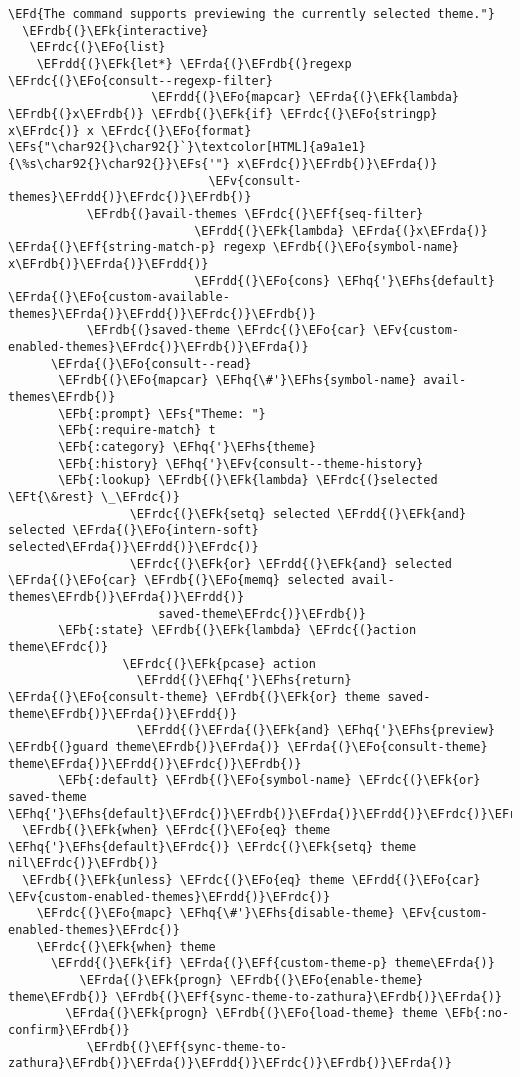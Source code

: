 \documentclass[a4wide,10pt]{article}
\newcommand{\EFs}[1]{\textcolor{EFs}{#1}} %
\newcommand{\EFd}[1]{\textcolor{EFd}{#1}} %
\newcommand{\EFk}[1]{\textcolor{EFk}{#1}} %
\newcommand{\EFb}[1]{\textcolor{EFb}{#1}} %
\newcommand{\EFf}[1]{\textcolor{EFf}{#1}} %
\newcommand{\EFv}[1]{\textcolor{EFv}{#1}} %
\newcommand{\EFt}[1]{\textcolor{EFt}{#1}} %
\newcommand{\EFo}[1]{\textcolor{EFo}{#1}} %
\newcommand{\EFhq}[1]{\textcolor{EFhq}{#1}} %
\newcommand{\EFhs}[1]{\textcolor{EFhs}{#1}} %
\newcommand{\EFrda}[1]{\textcolor{EFrda}{#1}} %
\newcommand{\EFrdb}[1]{\textcolor{EFrdb}{#1}} %
\newcommand{\EFrdc}[1]{\textcolor{EFrdc}{#1}} %
\newcommand{\EFrdd}[1]{\textcolor{EFrdd}{#1}} %
\begin{document}
\begin{Code}
\begin{Verbatim}
\EFd{The command supports previewing the currently selected theme."}
  \EFrdb{(}\EFk{interactive}
   \EFrdc{(}\EFo{list}
    \EFrdd{(}\EFk{let*} \EFrda{(}\EFrdb{(}regexp \EFrdc{(}\EFo{consult--regexp-filter}
                    \EFrdd{(}\EFo{mapcar} \EFrda{(}\EFk{lambda} \EFrdb{(}x\EFrdb{)} \EFrdb{(}\EFk{if} \EFrdc{(}\EFo{stringp} x\EFrdc{)} x \EFrdc{(}\EFo{format} \EFs{"\char92{}\char92{}`}\textcolor[HTML]{a9a1e1}{\%s\char92{}\char92{}}\EFs{'"} x\EFrdc{)}\EFrdb{)}\EFrda{)}
                            \EFv{consult-themes}\EFrdd{)}\EFrdc{)}\EFrdb{)}
           \EFrdb{(}avail-themes \EFrdc{(}\EFf{seq-filter}
                          \EFrdd{(}\EFk{lambda} \EFrda{(}x\EFrda{)} \EFrda{(}\EFf{string-match-p} regexp \EFrdb{(}\EFo{symbol-name} x\EFrdb{)}\EFrda{)}\EFrdd{)}
                          \EFrdd{(}\EFo{cons} \EFhq{'}\EFhs{default} \EFrda{(}\EFo{custom-available-themes}\EFrda{)}\EFrdd{)}\EFrdc{)}\EFrdb{)}
           \EFrdb{(}saved-theme \EFrdc{(}\EFo{car} \EFv{custom-enabled-themes}\EFrdc{)}\EFrdb{)}\EFrda{)}
      \EFrda{(}\EFo{consult--read}
       \EFrdb{(}\EFo{mapcar} \EFhq{\#'}\EFhs{symbol-name} avail-themes\EFrdb{)}
       \EFb{:prompt} \EFs{"Theme: "}
       \EFb{:require-match} t
       \EFb{:category} \EFhq{'}\EFhs{theme}
       \EFb{:history} \EFhq{'}\EFv{consult--theme-history}
       \EFb{:lookup} \EFrdb{(}\EFk{lambda} \EFrdc{(}selected \EFt{\&rest} \_\EFrdc{)}
                 \EFrdc{(}\EFk{setq} selected \EFrdd{(}\EFk{and} selected \EFrda{(}\EFo{intern-soft} selected\EFrda{)}\EFrdd{)}\EFrdc{)}
                 \EFrdc{(}\EFk{or} \EFrdd{(}\EFk{and} selected \EFrda{(}\EFo{car} \EFrdb{(}\EFo{memq} selected avail-themes\EFrdb{)}\EFrda{)}\EFrdd{)}
                     saved-theme\EFrdc{)}\EFrdb{)}
       \EFb{:state} \EFrdb{(}\EFk{lambda} \EFrdc{(}action theme\EFrdc{)}
                \EFrdc{(}\EFk{pcase} action
                  \EFrdd{(}\EFhq{'}\EFhs{return} \EFrda{(}\EFo{consult-theme} \EFrdb{(}\EFk{or} theme saved-theme\EFrdb{)}\EFrda{)}\EFrdd{)}
                  \EFrdd{(}\EFrda{(}\EFk{and} \EFhq{'}\EFhs{preview} \EFrdb{(}guard theme\EFrdb{)}\EFrda{)} \EFrda{(}\EFo{consult-theme} theme\EFrda{)}\EFrdd{)}\EFrdc{)}\EFrdb{)}
       \EFb{:default} \EFrdb{(}\EFo{symbol-name} \EFrdc{(}\EFk{or} saved-theme \EFhq{'}\EFhs{default}\EFrdc{)}\EFrdb{)}\EFrda{)}\EFrdd{)}\EFrdc{)}\EFrdb{)}
  \EFrdb{(}\EFk{when} \EFrdc{(}\EFo{eq} theme \EFhq{'}\EFhs{default}\EFrdc{)} \EFrdc{(}\EFk{setq} theme nil\EFrdc{)}\EFrdb{)}
  \EFrdb{(}\EFk{unless} \EFrdc{(}\EFo{eq} theme \EFrdd{(}\EFo{car} \EFv{custom-enabled-themes}\EFrdd{)}\EFrdc{)}
    \EFrdc{(}\EFo{mapc} \EFhq{\#'}\EFhs{disable-theme} \EFv{custom-enabled-themes}\EFrdc{)}
    \EFrdc{(}\EFk{when} theme
      \EFrdd{(}\EFk{if} \EFrda{(}\EFf{custom-theme-p} theme\EFrda{)}
          \EFrda{(}\EFk{progn} \EFrdb{(}\EFo{enable-theme} theme\EFrdb{)} \EFrdb{(}\EFf{sync-theme-to-zathura}\EFrdb{)}\EFrda{)}
        \EFrda{(}\EFk{progn} \EFrdb{(}\EFo{load-theme} theme \EFb{:no-confirm}\EFrdb{)}
           \EFrdb{(}\EFf{sync-theme-to-zathura}\EFrdb{)}\EFrda{)}\EFrdd{)}\EFrdc{)}\EFrdb{)}\EFrda{)}


\end{Verbatim}
\end{Code}
\end{document}
